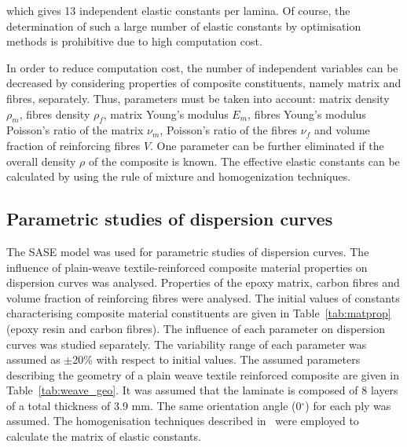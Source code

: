  which gives 13 independent elastic constants per lamina. Of course, the determination of such a large number of elastic constants by optimisation methods is prohibitive due to high computation cost. 
 
 In order to reduce computation cost, the number of independent variables can be 
 decreased by considering properties of composite constituents, namely matrix and 
 fibres, separately. Thus,     parameters must be taken into account: matrix density 
 \(\rho_m\), fibres density \(\rho_f\), matrix Young's modulus \(E_m\), fibres Young's 
 modulus   
 Poisson's ratio of the matrix \(\nu_m\), Poisson's ratio of the fibres \(\nu_f\) and volume 
 fraction of reinforcing fibres \(V\). One parameter can be further eliminated if the 
 overall 
 density \(\rho\) of the composite is known.  The effective elastic constants can be calculated by using the rule of 
 mixture and homogenization techniques.
  
\subsection{Parametric studies of dispersion curves \label{sec:parametric}}
  The SASE model was used for parametric studies of dispersion curves. The influence 
 of plain-weave textile-reinforced composite material properties on dispersion curves 
 was analysed. Properties of the epoxy matrix, carbon fibres and volume fraction of 
 reinforcing fibres were analysed. The initial values of constants characterising 
 composite material constituents are given in Table~\ref{tab:matprop} (epoxy resin and 
 carbon fibres). The influence of each parameter on dispersion curves was studied 
 separately. The variability range of each parameter was assumed as \(\pm\)20\% with 
 respect to initial values. The assumed parameters describing the geometry of a plain 
 weave textile reinforced composite are given in Table~\ref{tab:weave_geo}. It was 
 assumed that the laminate is composed of 8 layers of a total thickness of 3.9 mm. The 
 same orientation angle (0\(^{\circ}\)) for each ply was assumed. The homogenisation 
 techniques described in~\cite{Barbero2006,Adumitroaie2012} were employed to 
 calculate the matrix of elastic constants.
 
